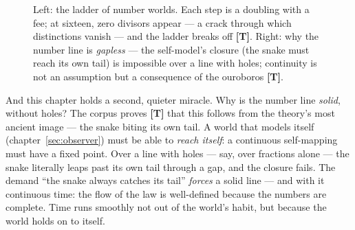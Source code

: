 \documentclass[11pt,letterpaper]{article}
\newcommand{\stT}{\textbf{[T]}\xspace}
\begin{document}
\begin{figure}[H]
\centering
{}
\caption{Left: the ladder of number worlds. Each step is a doubling
with a fee; at sixteen, zero divisors appear --- a crack through which
distinctions vanish --- and the ladder breaks off \stT. Right: why the
number line is \emph{gapless} --- the self-model's closure (the snake
must reach its own tail) is impossible over a line with holes;
continuity is not an assumption but a consequence of the ouroboros
\stT.}
\label{fig:numbers}
\end{figure}

And this chapter holds a second, quieter miracle. Why is the number
line \emph{solid}, without holes? The corpus proves \stT{} that this
follows from the theory's most ancient image --- the snake biting its
own tail. A world that models itself (chapter~\ref{sec:observer})
must be able to \emph{reach itself}: a continuous self-mapping must
have a fixed point. Over a line with holes --- say, over fractions
alone --- the snake literally leaps past its own tail through a gap,
and the closure fails. The demand ``the snake always catches its
tail'' \emph{forces} a solid line --- and with it continuous time:
the flow of the law is well-defined because the numbers are complete.
Time runs smoothly not out of the world's habit, but because the
world holds on to itself.
\end{document}
